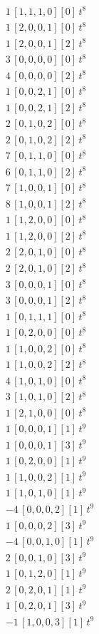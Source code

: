 \begin{align*}
1\,[1,1,1,0] [0]\,t^{8} \\
1\,[2,0,0,1] [0]\,t^{8} \\
1\,[2,0,0,1] [2]\,t^{8} \\
3\,[0,0,0,0] [0]\,t^{8} \\
4\,[0,0,0,0] [2]\,t^{8} \\
1\,[0,0,2,1] [0]\,t^{8} \\
1\,[0,0,2,1] [2]\,t^{8} \\
2\,[0,1,0,2] [0]\,t^{8} \\
2\,[0,1,0,2] [2]\,t^{8} \\
7\,[0,1,1,0] [0]\,t^{8} \\
6\,[0,1,1,0] [2]\,t^{8} \\
7\,[1,0,0,1] [0]\,t^{8} \\
8\,[1,0,0,1] [2]\,t^{8} \\
1\,[1,2,0,0] [0]\,t^{8} \\
1\,[1,2,0,0] [2]\,t^{8} \\
2\,[2,0,1,0] [0]\,t^{8} \\
2\,[2,0,1,0] [2]\,t^{8} \\
3\,[0,0,0,1] [0]\,t^{8} \\
3\,[0,0,0,1] [2]\,t^{8} \\
1\,[0,1,1,1] [0]\,t^{8} \\
1\,[0,2,0,0] [0]\,t^{8} \\
1\,[1,0,0,2] [0]\,t^{8} \\
1\,[1,0,0,2] [2]\,t^{8} \\
4\,[1,0,1,0] [0]\,t^{8} \\
3\,[1,0,1,0] [2]\,t^{8} \\
1\,[2,1,0,0] [0]\,t^{8} \\
1\,[0,0,0,1] [1]\,t^{9} \\
1\,[0,0,0,1] [3]\,t^{9} \\
1\,[0,2,0,0] [1]\,t^{9} \\
1\,[1,0,0,2] [1]\,t^{9} \\
1\,[1,0,1,0] [1]\,t^{9} \\
-4\,[0,0,0,2] [1]\,t^{9} \\
1\,[0,0,0,2] [3]\,t^{9} \\
-4\,[0,0,1,0] [1]\,t^{9} \\
2\,[0,0,1,0] [3]\,t^{9} \\
1\,[0,1,2,0] [1]\,t^{9} \\
2\,[0,2,0,1] [1]\,t^{9} \\
1\,[0,2,0,1] [3]\,t^{9} \\
-1\,[1,0,0,3] [1]\,t^{9} \\

\end{align*}

